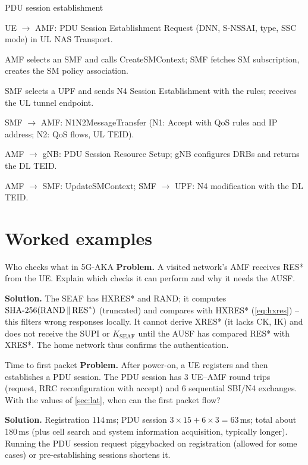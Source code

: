 \documentclass[11pt,a4paper]{article}
\begin{document}
\begin{procedurebox}{PDU session establishment}\label{proc:pdu}
\begin{steps}
  \item UE $\to$ AMF: PDU Session Establishment Request (DNN, S-NSSAI, type, SSC mode) in UL NAS Transport.
  \item AMF selects an SMF and calls CreateSMContext; SMF fetches SM subscription, creates the SM policy association.
  \item SMF selects a UPF and sends N4 Session Establishment with the rules; receives the UL tunnel endpoint.
  \item SMF $\to$ AMF: N1N2MessageTransfer (N1: Accept with QoS rules and IP address; N2: QoS flows, UL TEID).
  \item AMF $\to$ gNB: PDU Session Resource Setup; gNB configures DRBs and returns the DL TEID.
  \item AMF $\to$ SMF: UpdateSMContext; SMF $\to$ UPF: N4 modification with the DL TEID.
\end{steps}
\end{procedurebox}

\section{Worked examples}

\begin{examplebox}{Who checks what in 5G-AKA}\label{ex:aka}
\textbf{Problem.} A visited network's AMF receives RES* from the UE. Explain which checks it can perform and why it needs the AUSF.

\textbf{Solution.} The SEAF has HXRES* and RAND; it computes $\mathrm{SHA\text{-}256}(\mathrm{RAND}\,\Vert\,\mathrm{RES}^*)$ (truncated) and compares with
HXRES* (\cref{eq:hxres}) -- this filters wrong responses locally. It cannot derive XRES* (it lacks CK, IK) and does not receive the SUPI
or $K_{\mathrm{SEAF}}$ until the AUSF has compared RES* with XRES*. The home network thus confirms the authentication.
\end{examplebox}

\begin{examplebox}{Time to first packet}\label{ex:first}
\textbf{Problem.} After power-on, a UE registers and then establishes a PDU session. The PDU session has 3 UE--AMF round trips (request, RRC
reconfiguration with accept) and 6 sequential SBI/N4 exchanges. With the values of \cref{sec:lat}, when can the first packet flow?

\textbf{Solution.} Registration 114\,ms; PDU session $3\times15 + 6\times3 = 63$\,ms; total about 180\,ms (plus cell search and system information
acquisition, typically longer). Running the PDU session request piggybacked on registration (allowed for some cases) or pre-establishing
sessions shortens it.
\end{examplebox}
\end{document}
